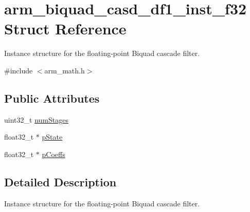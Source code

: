 \hypertarget{structarm__biquad__casd__df1__inst__f32}{\section{arm\-\_\-biquad\-\_\-casd\-\_\-df1\-\_\-inst\-\_\-f32 Struct Reference}
\label{structarm__biquad__casd__df1__inst__f32}
}


Instance structure for the floating-\/point Biquad cascade filter.  




{\ttfamily \#include $<$arm\-\_\-math.\-h$>$}

\subsection*{Public Attributes}
\begin{DoxyCompactItemize}
\item 
uint32\-\_\-t \hyperlink{structarm__biquad__casd__df1__inst__f32_af69820c37a87252c46453e4cfe120585}{num\-Stages}
\item 
float32\-\_\-t $\ast$ \hyperlink{structarm__biquad__casd__df1__inst__f32_a8c245d79e0d8cfabc82409d4b54fb682}{p\-State}
\item 
float32\-\_\-t $\ast$ \hyperlink{structarm__biquad__casd__df1__inst__f32_af9df3820576fb921809d1462c9c6d16c}{p\-Coeffs}
\end{DoxyCompactItemize}


\subsection{Detailed Description}
Instance structure for the floating-\/point Biquad cascade filter. 

